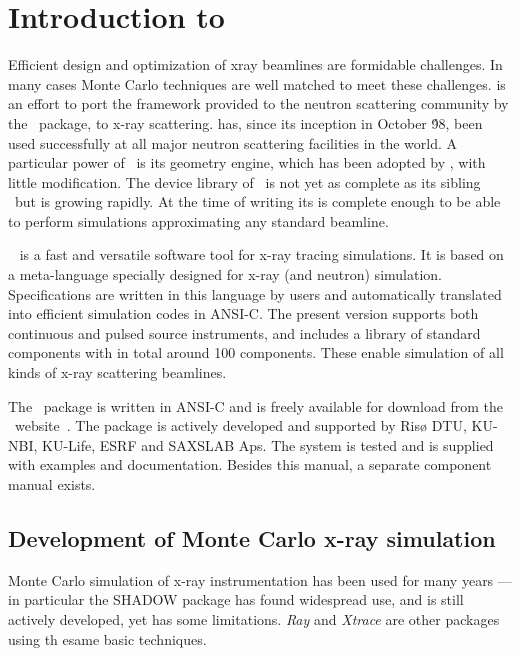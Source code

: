 
\chapter{Introduction to \MCX}

Efficient design and optimization of xray beamlines are
formidable challenges. In many cases Monte Carlo techniques are well matched to meet
these challenges. 
\MCX is an effort to port the framework provided to the neutron scattering community by the \MCS\ package, to x-ray scattering. \MCS has, since its inception in October \'98, been used successfully at all major neutron scattering facilities in the world. A particular power of \MCS\ is its geometry engine, which has been adopted by \MCX, with little modification. The device library of \MCX\ is not yet as complete as its sibling \MCS\ but is growing rapidly.
At the time of writing its is complete enough to be able to perform simulations approximating any standard beamline.

\MCX\ %
is a fast and versatile software tool for x-ray tracing simulations.
It is based on a meta-language specially designed for x-ray (and neutron)
simulation. Specifications are written in this language by users and
automatically translated into efficient simulation codes in ANSI-C.
The present version supports both continuous and pulsed source instruments, and includes a library of standard
components with in total around 100 components. These enable simulation of all kinds of x-ray scattering beamlines.

The \MCX\ package is written in ANSI-C and is freely available for download
from the \MCX\ website~\cite{mcxtrace_webpage}. The package is actively
developed and supported by  Risø DTU, KU-NBI, KU-Life, ESRF and SAXSLAB Aps.
The system is tested and is supplied with examples and documentation.
Besides this manual, a separate component manual exists.


\section{Development of Monte Carlo x-ray simulation}
Monte Carlo simulation of x-ray instrumentation has been used for many years --- in particular the SHADOW package 
has found widespread use, and is still actively developed, yet has some
limitations. \emph{Ray} and \emph{Xtrace} are other packages using th esame
basic techniques. 

